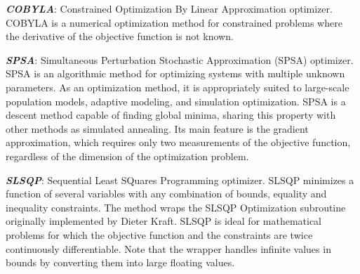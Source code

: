 \textbf{\textit{COBYLA}}: Constrained Optimization By Linear Approximation optimizer. COBYLA is a numerical optimization method for constrained problems where the derivative of the objective function is not known.

\textbf{\textit{SPSA}}: Simultaneous Perturbation Stochastic Approximation (SPSA) optimizer. SPSA is an algorithmic method for optimizing systems with multiple unknown parameters. As an optimization method, it is appropriately suited to large-scale population models, adaptive modeling, and simulation optimization. SPSA is a descent method capable of finding global minima, sharing this property with other methods as simulated annealing. Its main feature is the gradient approximation, which requires only two measurements of the objective function, regardless of the dimension of the optimization problem.

\textbf{\textit{SLSQP}}: Sequential Least SQuares Programming optimizer. SLSQP minimizes a function of several variables with any combination of bounds, equality and inequality constraints. The method wraps the SLSQP Optimization subroutine originally implemented by Dieter Kraft. SLSQP is ideal for mathematical problems for which the objective function and the constraints are twice continuously differentiable. Note that the wrapper handles infinite values in bounds by converting them into large floating values.
